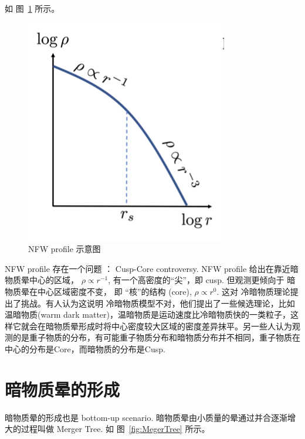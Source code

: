 \documentclass[12pt]{ctexart}
\newcommand{\reffig}[1]{图~\ref{#1}}
\begin{document}
如 \reffig{fig:NFW}  所示。
\begin{figure}[!hbtp]
	\centering 
	\includegraphics[width=1.0\linewidth]{NFW.png}
	\caption{NFW profile 示意图}
    \label{fig:NFW}
\end{figure}

NFW profile 存在一个问题 ： Cusp-Core controversy. 
NFW profile 给出在靠近暗物质晕中心的区域， $\rho \propto r^{-1}$, 有一个高密度的“尖”，即 cusp.
但观测更倾向于 暗物质晕在中心区域密度不变， 即 “核”的结构 (core), $\rho \propto r^0$.
这对 冷暗物质理论提出了挑战。有人认为这说明 冷暗物质模型不对，他们提出了一些候选理论，比如温暗物质(warm dark matter)，温暗物质是运动速度比冷暗物质快的一类粒子，这样它就会在暗物质晕形成时将中心密度较大区域的密度差异抹平。另一些人认为观测的是重子物质的分布，有可能重子物质分布和暗物质分布并不相同，重子物质在中心的分布是Core，而暗物质的分布是Cusp.

\section{暗物质晕的形成}

暗物质晕的形成也是 bottom-up scenario.
暗物质晕由小质量的晕通过并合逐渐增大的过程叫做 
Merger Tree. 如 \reffig{fig:MegerTree} 所示。
\end{document}
